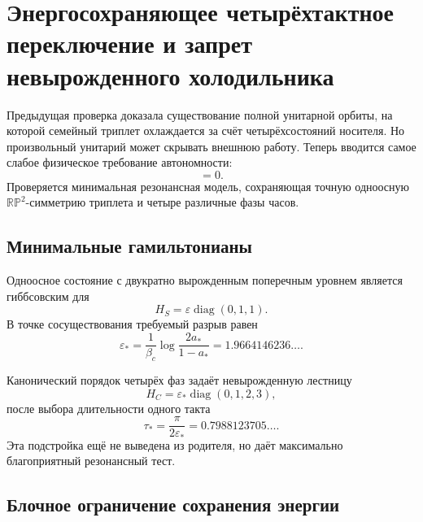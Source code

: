 \chapter{Энергосохраняющее четырёхтактное переключение и запрет невырожденного холодильника}

Предыдущая проверка доказала существование полной унитарной орбиты, на которой
семейный триплет охлаждается за счёт четырёхсостояний носителя. Но
произвольный унитарий может скрывать внешнюю работу. Теперь вводится самое
слабое физическое требование автономности:
\begin{equation}
 [W,H_S+H_C]=0.
 \label{eq:v6-energy-preserving-clock-control}
\end{equation}
Проверяется минимальная резонансная модель, сохраняющая точную одноосную
$\mathbb{RP}^2$-симметрию триплета и четыре различные фазы часов.

\section{Минимальные гамильтонианы}

Одноосное состояние с двукратно вырожденным поперечным уровнем является
гиббсовским для
\begin{equation}
 H_S=\varepsilon\operatorname{diag}(0,1,1).
 \label{eq:v6-uniaxial-qutrit-hamiltonian}
\end{equation}
В точке сосуществования требуемый разрыв равен
\begin{equation}
 \varepsilon_*
 =\frac1{\beta_c}\log\frac{2a_*}{1-a_*}
 =1.9664146236\ldots.
 \label{eq:v6-coexistence-gibbs-gap}
\end{equation}

Канонический порядок четырёх фаз задаёт невырожденную лестницу
\begin{equation}
 H_C=\varepsilon_*\operatorname{diag}(0,1,2,3),
 \label{eq:v6-four-tick-energy-ladder}
\end{equation}
после выбора длительности одного такта
\begin{equation}
 \tau_* =\frac{\pi}{2\varepsilon_*}
 =0.7988123705\ldots.
\end{equation}
Эта подстройка ещё не выведена из родителя, но даёт максимально
благоприятный резонансный тест.

\section{Блочное ограничение сохранения энергии}


